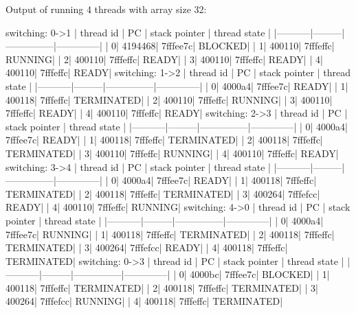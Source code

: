 \documentclass[a4paper]{article}
\begin{document}
\newpage


Output of running 4 threads with array size 32:

\begin{textcode}
switching: 0->1
| thread id |      PC | stack pointer | thread state |
|-----------|---------|---------------|--------------|
|          0|  4194468|       7fffee7c|       BLOCKED|
|          1|   400110|       7fffeffc|       RUNNING|
|          2|   400110|       7fffeffc|         READY|
|          3|   400110|       7fffeffc|         READY|
|          4|   400110|       7fffeffc|         READY|
switching: 1->2
| thread id |      PC | stack pointer | thread state |
|-----------|---------|---------------|--------------|
|          0|   4000a4|       7fffee7c|         READY|
|          1|   400118|       7fffeffc|    TERMINATED|
|          2|   400110|       7fffeffc|       RUNNING|
|          3|   400110|       7fffeffc|         READY|
|          4|   400110|       7fffeffc|         READY|
switching: 2->3
| thread id |      PC | stack pointer | thread state |
|-----------|---------|---------------|--------------|
|          0|   4000a4|       7fffee7c|         READY|
|          1|   400118|       7fffeffc|    TERMINATED|
|          2|   400118|       7fffeffc|    TERMINATED|
|          3|   400110|       7fffeffc|       RUNNING|
|          4|   400110|       7fffeffc|         READY|
switching: 3->4
| thread id |      PC | stack pointer | thread state |
|-----------|---------|---------------|--------------|
|          0|   4000a4|       7fffee7c|         READY|
|          1|   400118|       7fffeffc|    TERMINATED|
|          2|   400118|       7fffeffc|    TERMINATED|
|          3|   400264|       7fffefcc|         READY|
|          4|   400110|       7fffeffc|       RUNNING|
switching: 4->0
| thread id |      PC | stack pointer | thread state |
|-----------|---------|---------------|--------------|
|          0|   4000a4|       7fffee7c|       RUNNING|
|          1|   400118|       7fffeffc|    TERMINATED|
|          2|   400118|       7fffeffc|    TERMINATED|
|          3|   400264|       7fffefcc|         READY|
|          4|   400118|       7fffeffc|    TERMINATED|
switching: 0->3
| thread id |      PC | stack pointer | thread state |
|-----------|---------|---------------|--------------|
|          0|   4000bc|       7fffee7c|       BLOCKED|
|          1|   400118|       7fffeffc|    TERMINATED|
|          2|   400118|       7fffeffc|    TERMINATED|
|          3|   400264|       7fffefcc|       RUNNING|
|          4|   400118|       7fffeffc|    TERMINATED|

\end{textcode}
\end{document}
